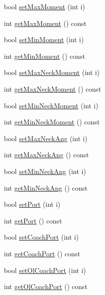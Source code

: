 \begin{DoxyCompactItemize}
\item 
bool \hyperlink{classServerSettings_aaa6c80b75827c9b4db6839fa47fe0714}{set\+Max\+Moment} (int i)
\item 
int \hyperlink{classServerSettings_ab04da6dddd31999ab1331f53ba60f4eb}{get\+Max\+Moment} () const 
\item 
bool \hyperlink{classServerSettings_abfb9f165e7803fecd973014ce8a174be}{set\+Min\+Moment} (int i)
\item 
int \hyperlink{classServerSettings_ae16f78bc2d2df91fb22355e8fbb32714}{get\+Min\+Moment} () const 
\item 
bool \hyperlink{classServerSettings_aa712cf5ce1eb2f405a177a28fe58bac3}{set\+Max\+Neck\+Moment} (int i)
\item 
int \hyperlink{classServerSettings_a2123147fd729382d4d8477f07721f4a5}{get\+Max\+Neck\+Moment} () const 
\item 
bool \hyperlink{classServerSettings_a1ec07e04a2e18179ebd88e1c386e472f}{set\+Min\+Neck\+Moment} (int i)
\item 
int \hyperlink{classServerSettings_afe5791e9c4976346dedff56d1b499e7a}{get\+Min\+Neck\+Moment} () const 
\item 
bool \hyperlink{classServerSettings_a86f7a2387351f4703c58268cf4c3f919}{set\+Max\+Neck\+Ang} (int i)
\item 
int \hyperlink{classServerSettings_a255d2d8c5c3de7d995672693381f4574}{get\+Max\+Neck\+Ang} () const 
\item 
bool \hyperlink{classServerSettings_ad071affea570ae510b49aa332eedf7d0}{set\+Min\+Neck\+Ang} (int i)
\item 
int \hyperlink{classServerSettings_a710b861da6c005393452eb87893ccddc}{get\+Min\+Neck\+Ang} () const 
\item 
bool \hyperlink{classServerSettings_a4f9afe067291c05312acaedcb6a46153}{set\+Port} (int i)
\item 
int \hyperlink{classServerSettings_a306ae49f2b66f052ab4a31e3a07f725a}{get\+Port} () const 
\item 
bool \hyperlink{classServerSettings_a5a28c1e193c98556d85b5f2c3ebe649c}{set\+Coach\+Port} (int i)
\item 
int \hyperlink{classServerSettings_a5c25e01f01e6bd6e638489c2b7494a3c}{get\+Coach\+Port} () const 
\item 
bool \hyperlink{classServerSettings_aca252ddb8afa5b62ecc99c56b9b1f83b}{set\+Ol\+Coach\+Port} (int i)
\item 
int \hyperlink{classServerSettings_a3bb63f494c02965a2d35b9ebcf851608}{get\+Ol\+Coach\+Port} () const 

\end{DoxyCompactItemize}
